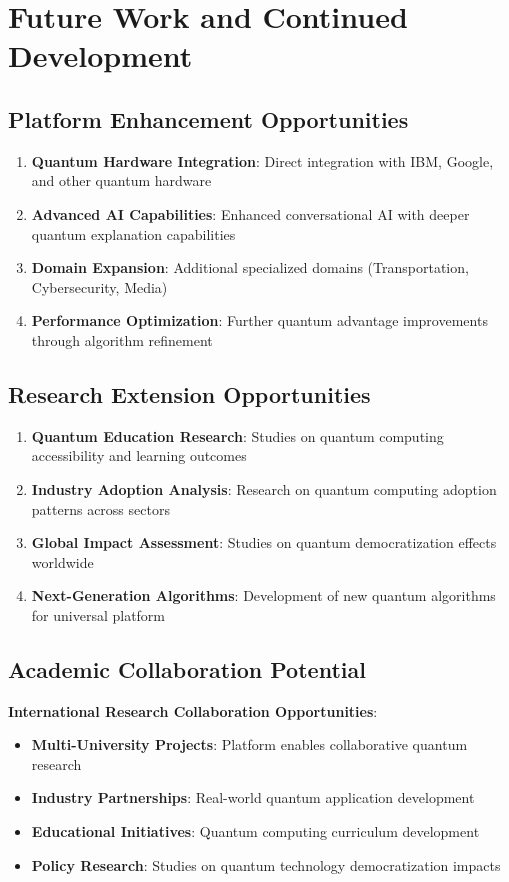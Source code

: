 \documentclass[12pt,a4paper]{article}
\begin{document}
\section{Future Work and Continued Development}

\subsection{Platform Enhancement Opportunities}

\begin{enumerate}
    \item \textbf{Quantum Hardware Integration}: Direct integration with IBM, Google, and other quantum hardware
    \item \textbf{Advanced AI Capabilities}: Enhanced conversational AI with deeper quantum explanation capabilities
    \item \textbf{Domain Expansion}: Additional specialized domains (Transportation, Cybersecurity, Media)
    \item \textbf{Performance Optimization}: Further quantum advantage improvements through algorithm refinement
\end{enumerate}

\subsection{Research Extension Opportunities}

\begin{enumerate}
    \item \textbf{Quantum Education Research}: Studies on quantum computing accessibility and learning outcomes
    \item \textbf{Industry Adoption Analysis}: Research on quantum computing adoption patterns across sectors
    \item \textbf{Global Impact Assessment}: Studies on quantum democratization effects worldwide
    \item \textbf{Next-Generation Algorithms}: Development of new quantum algorithms for universal platform
\end{enumerate}

\subsection{Academic Collaboration Potential}

\textbf{International Research Collaboration Opportunities}:
\begin{itemize}
    \item \textbf{Multi-University Projects}: Platform enables collaborative quantum research
    \item \textbf{Industry Partnerships}: Real-world quantum application development
    \item \textbf{Educational Initiatives}: Quantum computing curriculum development
    \item \textbf{Policy Research}: Studies on quantum technology democratization impacts
\end{itemize}
\end{document}
